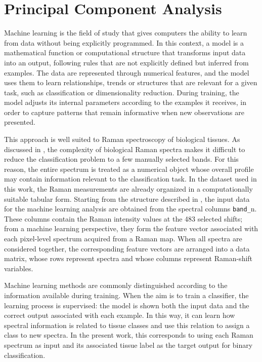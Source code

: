 \chapter{Principal Component Analysis }
\label{ch:pca}


Machine learning is the field of study that gives computers the ability to learn from data without being explicitly programmed. In this context, a model is a mathematical function or computational structure that transforms input data into an output, following rules that are not explicitly defined but inferred from examples. The data are represented through numerical features, and the model uses them to learn relationships, trends or structures that are relevant for a given task, such as classification or dimensionality reduction. During training, the model adjusts its internal parameters according to the examples it receives, in order to capture patterns that remain informative when new observations are presented.

This approach is well suited to Raman spectroscopy of biological tissues. As discussed in , the complexity of biological Raman spectra makes it difficult to reduce the classification problem to a few manually selected bands. For this reason, the entire spectrum is treated as a numerical object whose overall profile may contain information relevant to the classification task. In the dataset used in this work, the Raman measurements are already organized in a computationally suitable tabular form. Starting from the structure described in , the input data for the machine learning analysis are obtained from the spectral columns \texttt{band\_}n. These columns contain the Raman intensity values at the 483 selected shifts; from a machine learning perspective, they form the feature vector associated with each pixel-level spectrum acquired from a Raman map. When all spectra are considered together, the corresponding feature vectors are arranged into a data matrix, whose rows represent spectra and whose columns represent Raman-shift variables. 

Machine learning methods are commonly distinguished according to the information available during training. When the aim is to train a classifier, the learning process is supervised: the model is shown both the input data and the correct output associated with each example. In this way, it can learn how spectral information is related to tissue classes and use this relation to assign a class to new spectra. In the present work, this corresponds to using each Raman spectrum as input and its associated tissue label as the target output for binary classification.

